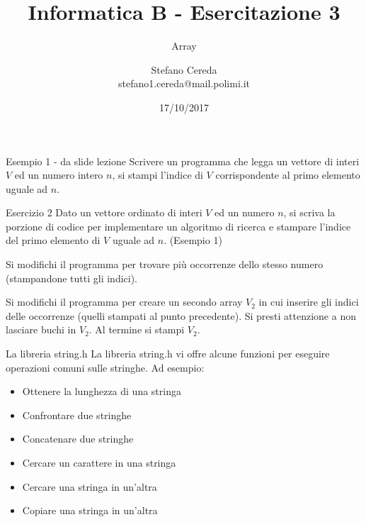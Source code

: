 \documentclass[handout]{beamer}
\title{Informatica B - Esercitazione 3}
\subtitle{Array}
\author{Stefano Cereda\\
		stefano1.cereda@mail.polimi.it
	}
\date{17/10/2017}
\institute[PoliMi]{\vspace{0.5cm}\centering Politecnico di Milano \\ \vspace{0.2cm}
	\texttt{[image: ./logopolimi]}}
\begin{document}
\begin{frame}
	\maketitle
\end{frame}


\begin{frame}{Esempio 1 - da slide lezione}
Scrivere un programma che legga un vettore di interi $V$ ed un numero intero $n$, si stampi l'indice di $V$ corrispondente al primo elemento uguale ad $n$.
\end{frame}

\begin{frame}{Esercizio 2}
Dato un vettore ordinato di interi $V$ ed un numero $n$, si scriva la porzione di codice per implementare un algoritmo di ricerca e stampare l'indice del primo elemento di $V$ uguale ad $n$. (Esempio 1)

Si modifichi il programma per trovare più occorrenze dello stesso numero (stampandone tutti gli indici).

Si modifichi il programma per creare un secondo array $V_2$ in cui inserire gli indici delle occorrenze (quelli stampati al punto precedente). Si presti attenzione a non lasciare buchi in $V_2$. Al termine si stampi $V_2$.
\end{frame}

\begin{frame}{La libreria string.h}
La libreria string.h vi offre alcune funzioni per eseguire operazioni comuni sulle stringhe. Ad esempio:
\begin{itemize}
	\item Ottenere la lunghezza di una stringa
	\item Confrontare due stringhe
	\item Concatenare due stringhe
	\item Cercare un carattere in una stringa
	\item Cercare una stringa in un'altra
	\item Copiare una stringa in un'altra
\end{itemize}
\end{frame}
\end{document}
